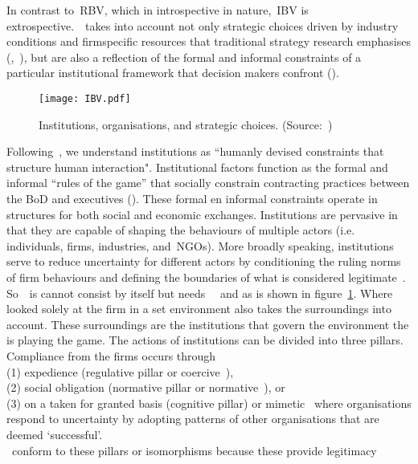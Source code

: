 In contrast to~\gls{RBV}, which in introspective in nature,~\gls{IBV} is extrospective.~\ibv~takes into 
account not only strategic choices driven by industry conditions and firm\-specific resources that 
traditional strategy research emphasises (\cite{Porter:1980},~\cite{Barney:1991}), but are also a 
reflection of the formal and informal constraints of a particular institutional framework that decision
makers confront (\cite{Oliver:1997,Scott:2001}). \\

\begin{figure}[htbp!] 
	\centering
	\texttt{[image: IBV.pdf]}
 	\caption{Institutions, organisations, and strategic choices. (Source:~\cite{Peng:2000})}
	\label{fig:ibv}
\end{figure}

Following~\cite{North:1990}, we understand institutions as ``humanly devised constraints
that structure human interaction". Institutional factors function as the formal and
informal ``rules of the game'' that socially constrain contracting practices between the \gls{BoD} and 
executives (\cite{North:1990}).  
These formal en informal constraints operate in structures for both social and economic exchanges. 
Institutions are pervasive in that they are capable of shaping the behaviours of multiple actors (i.e. 
individuals, firms, industries, and~\glspl{NGO}). More broadly speaking, institutions serve to reduce 
uncertainty for different actors by conditioning the ruling norms of firm behaviours and defining the 
boundaries of what is considered legitimate~\cite{Peng:2008}. \\

So~\ibv~is cannot consist by itself but needs~\rbv~\cite{Barney:1991} and \cite{Porter:1980} as is shown in figure~\ref{fig:ibv}. 
Where \rbv looked solely at the firm in a set environment \ibv also takes the surroundings into account. These surroundings are the institutions that govern the environment the \mne is playing the game. 
The actions of institutions can be divided into three pillars. Compliance from the firms occurs through \\(1) expedience (regulative pillar or coercive~\iso),\\
 (2) social obligation (normative pillar or normative~\iso), or \\
 (3) on a taken for granted basis (cognitive pillar) or mimetic \iso~where organisations respond to uncertainty by adopting patterns of other organisations that are deemed `successful'\cite{Westney:2005,Peng:2008,Kostova:1999,Dimaggio:1983,Scott:2001}.\\ 
~\mne conform to these pillars or isomorphisms because these provide legitimacy~\cite{Powell:1991}

